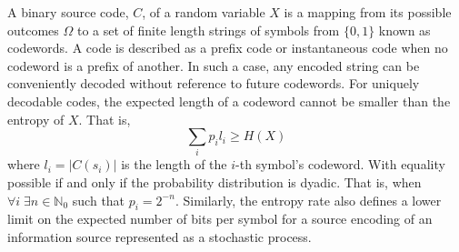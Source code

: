 A binary source code, $C$, of a random variable $X$ is a mapping from its possible outcomes $\Omega$ to a set of finite length strings of symbols from $\{0,1\}$ known as codewords. A code is described as a prefix code or instantaneous code when no codeword is a prefix of another. In such a case, any encoded string can be conveniently decoded without reference to future codewords. For uniquely decodable codes, the expected length of a codeword cannot be smaller than the entropy of $X$. That is, \[\sum_i p_il_i\ge H(X)\] where $l_i=|C(s_i)|$ is the length of the $i$-th symbol's codeword. With equality possible if and only if the probability distribution is dyadic. That is, when $\forall i\;\exists n\in\mathbb{N}_0$ such that $p_i=2^{-n}$. Similarly, the entropy rate also defines a lower limit on the expected number of bits per symbol for a source encoding of an information source represented as a stochastic process.%


